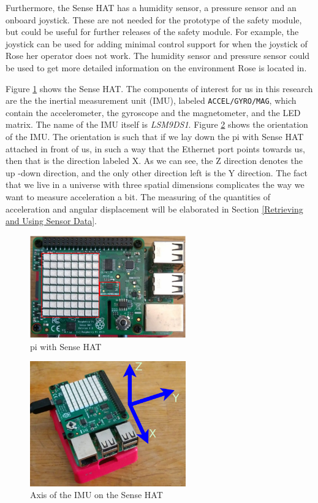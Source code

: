 \documentclass[12pt]{scrreprt}
\begin{document}
Furthermore, the Sense HAT has a humidity sensor, a  pressure sensor and an onboard joystick. These are not needed for the prototype of the safety module, but could be useful for further releases of the safety module. For example, the joystick can be used for adding minimal control support for when the joystick of Rose her operator does not work. The humidity sensor and pressure sensor could be used to get more detailed information on the environment Rose is located in.
\par
Figure \ref{fig:sensehat} shows the Sense HAT. The components of interest for us in this research are the the inertial measurement unit (IMU), labeled \texttt{ACCEL/GYRO/MAG}, which contain the accelerometer, the gyroscope and the magnetometer, and the LED matrix. The name of the IMU itself is \textit{LSM9DS1}. Figure \ref{fig:imu_orientation} shows the orientation of the IMU. The orientation is such that if we lay down the \gls{pi} with Sense HAT attached in front of us, in such a way that the Ethernet port points towards us, then that is the direction labeled X. As we can see, the Z direction denotes the up -down direction, and the only other direction left is the Y direction. The fact that we live in a universe with three spatial dimensions complicates the way we want to measure acceleration a bit. The measuring of the quantities of acceleration and angular displacement will be elaborated in Section \ref{Retrieving and Using Sensor Data}.

\begin{figure}[H]
    \centering
    \includegraphics[width=0.6\textwidth]{Figures/results/sense_hat_self_dia.png}
    \caption{\gls{pi} with Sense HAT}
    \label{fig:sensehat}
\end{figure}

\begin{figure}[H]
    \centering
    \includegraphics[width=0.6\textwidth]{Figures/results/pi_not_above.png}
    \caption{Axis of the IMU on the Sense HAT}
    \label{fig:imu_orientation}
\end{figure}
\end{document}
